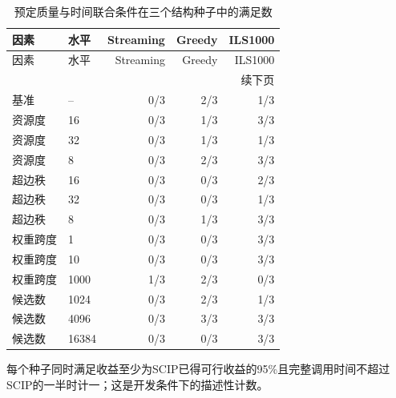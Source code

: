 {\small\setlength{\tabcolsep}{4pt}
\begin{longtable}{llrrr}
\caption{预定质量与时间联合条件在三个结构种子中的满足数}\label{tab:controlled_support}\\
\toprule
因素 & 水平 & Streaming & Greedy & ILS1000\\
\midrule
\endfirsthead
\toprule
因素 & 水平 & Streaming & Greedy & ILS1000\\
\midrule
\endhead
\midrule
\multicolumn{5}{r}{续下页}\\
\endfoot
\bottomrule
\endlastfoot
基准 & -- & 0/3 & 2/3 & 1/3\\
资源度 & 16 & 0/3 & 1/3 & 3/3\\
资源度 & 32 & 0/3 & 1/3 & 1/3\\
资源度 & 8 & 0/3 & 2/3 & 3/3\\
超边秩 & 16 & 0/3 & 0/3 & 2/3\\
超边秩 & 32 & 0/3 & 0/3 & 1/3\\
超边秩 & 8 & 0/3 & 1/3 & 3/3\\
权重跨度 & 1 & 0/3 & 0/3 & 3/3\\
权重跨度 & 10 & 0/3 & 0/3 & 3/3\\
权重跨度 & 1000 & 1/3 & 2/3 & 0/3\\
候选数 & 1024 & 0/3 & 2/3 & 1/3\\
候选数 & 4096 & 0/3 & 3/3 & 3/3\\
候选数 & 16384 & 0/3 & 0/3 & 3/3\\
\end{longtable}
}
每个种子同时满足收益至少为SCIP已得可行收益的95\%且完整调用时间不超过SCIP的一半时计一；这是开发条件下的描述性计数。
